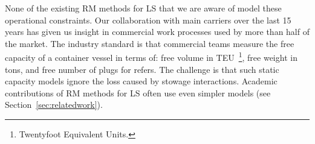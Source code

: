 None of the existing RM methods for LS that we are aware of model these operational constraints. Our collaboration with main carriers over the last 15 years has given us insight in commercial work processes used by more than half of the market. The industry standard is that commercial teams measure the free capacity of a container vessel in terms of: free volume in TEU~\footnote{Twentyfoot Equivalent Units.}, free weight in tons, and free number of plugs for refers. The challenge is that such static capacity models ignore the loss caused by stowage interactions. Academic contributions of RM methods for LS often use even simpler models (see Section~\ref{sec:relatedwork}).


